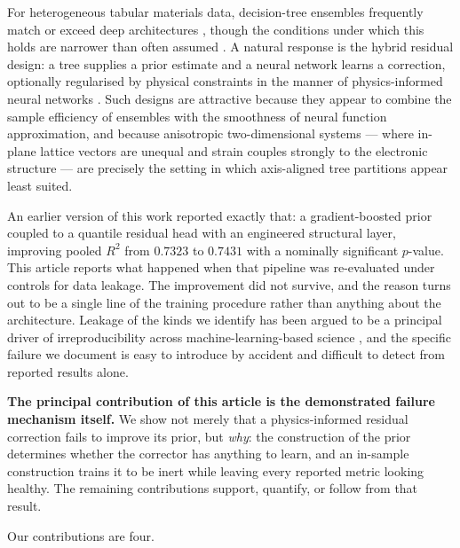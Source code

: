 \documentclass{ieeeaccess}
\begin{document}
For heterogeneous tabular materials data, decision-tree ensembles \cite{breiman2001random,friedman2001greedy} frequently match or exceed deep architectures \cite{shwartzziv2022tabular,grinsztajn2022why}, though the conditions under which this holds are narrower than often assumed \cite{mcelfresh2023when}. A natural response is the hybrid residual design: a tree supplies a prior estimate and a neural network learns a correction, optionally regularised by physical constraints in the manner of physics-informed neural networks \cite{raissi2019physics,karniadakis2021physics}. Such designs are attractive because they appear to combine the sample efficiency of ensembles with the smoothness of neural function approximation, and because anisotropic two-dimensional systems --- where in-plane lattice vectors are unequal and strain couples strongly to the electronic structure \cite{rodin2014strain,li2014black,xia2014rediscovering} --- are precisely the setting in which axis-aligned tree partitions appear least suited.

An earlier version of this work reported exactly that: a gradient-boosted prior coupled to a quantile residual head with an engineered structural layer, improving pooled $R^2$ from $0.7323$ to $0.7431$ with a nominally significant $p$-value. This article reports what happened when that pipeline was re-evaluated under controls for data leakage. The improvement did not survive, and the reason turns out to be a single line of the training procedure rather than anything about the architecture. Leakage of the kinds we identify has been argued to be a principal driver of irreproducibility across machine-learning-based science \cite{kapoor2023leakage}, and the specific failure we document is easy to introduce by accident and difficult to detect from reported results alone.

\textbf{The principal contribution of this article is the demonstrated failure mechanism itself.} We show not merely that a physics-informed residual correction fails to improve its prior, but \emph{why}: the construction of the prior determines whether the corrector has anything to learn, and an in-sample construction trains it to be inert while leaving every reported metric looking healthy. The remaining contributions support, quantify, or follow from that result.

Our contributions are four.
\end{document}
